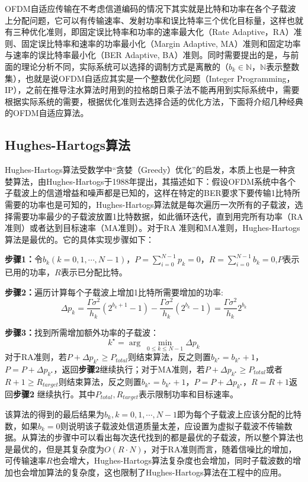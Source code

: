OFDM自适应传输在不考虑信道编码的情况下其实就是比特和功率在各个子载波上分配问题，它可以有传输速率、发射功率和误比特率三个优化目标量，这样也就有三种优化准则，即固定误比特率和功率的速率最大化（Rate Adaptive，RA）准则、固定误比特率和速率的功率最小化（Margin Adaptive, MA）准则和固定功率与速率的误比特率最小化（BER Adaptive, BA）准则。同时需要提出的是，与前面的理论分析不同，实际系统可以选择的调制方式是离散的（$b_k \in \mathbb{N}$，$\mathbb{N}$表示整数集），也就是说OFDM自适应其实是一个整数优化问题（Integer Programming，IP），之前在推导注水算法时用到的拉格朗日乘子法不能再用到实际系统中，需要根据实际系统的需要，根据优化准则去选择合适的优化方法，下面将介绍几种经典的OFDM自适应算法。
\subsection{Hughes-Hartogs算法}
Hughes-Hartogs算法\cite{hughes1989ensemble}受数学中“贪婪（Greedy）优化”的启发，本质上也是一种贪婪算法，由Hughes-Hartogs于1988年提出，其描述如下：假设OFDM系统中各个子载波上的信道增益和噪声都是已知的，这样在特定的BER要求下要传输1比特所需要的功率也是可知的，Hughes-Hartogs算法就是每次遍历一次所有的子载波，选择需要功率最少的子载波放置1比特数据，如此循环迭代，直到用完所有功率（RA准则）或者达到目标速率（MA准则）。对于RA 准则和MA准则，Hughes-Hartogs算法是最优的。它的具体实现步骤如下：
\begin{description}
\item{\bf{步骤1：}}令$b_k(k=0,1,\cdots,N-1)$，$P=\sum_{i=0}^{N-1}p_k=0$，$R=\sum_{i=0}^{N-1}b_k=0$,$P$表示已用的功率，$R$表示已分配比特。
\item{\bf{步骤2：}}遍历计算每个子载波上增加1比特所需要增加的功率:
\begin{equation}
\Delta p_k=\frac{\Gamma\sigma^2}{h_k}(2^{b_k+1}-1)-\frac{\Gamma\sigma^2}{h_k}(2^{b_k}-1)=\frac{\Gamma\sigma^2}{h_k}2^{b_k}
\end{equation}
\item{\bf{步骤3：}}找到所需增加额外功率的子载波：
\begin{equation}
k^{\star} = \arg\ \underset{0\leq k \leq N-1}{\min}\Delta p_k
\end{equation}
对于RA准则，若$P+\Delta p_{k^\star}\geq P_{total}$则结束算法，反之则置$b_{k^\star}=b_{k^\star}+1$，$P=P+\Delta p_{k^\star}$，返回\textbf{步骤2}继续执行；对于MA准则，若$P+\Delta p_{k^\star}\geq P_{total}$或者$R+1\geq R_{target}$则结束算法，反之则置$b_{k^\star}=b_{k^\star}+1$，$P=P+\Delta p_{k^\star}$，$R=R+1$返回\textbf{步骤2} 继续执行。其中$P_{total}, R_{target}$表示限制功率和目标速率。
\end{description}
该算法的得到的最后结果为$b_k, k=0,1,\cdots,N-1$即为每个子载波上应该分配的比特数，如果$b_k=0$则说明该子载波处信道质量太差，应设置为虚拟子载波不传输数据。从算法的步骤中可以看出每次迭代找到的都是最优的子载波，所以整个算法也是最优的，但是其复杂度为$O(R\cdot N)$，对于RA准则而言，随着信噪比的增加，可传输速率$R$也会增大，Hughes-Hartogs算法复杂度也会增加，同时子载波数的增加也会增加算法的复杂度，这也限制了Hughes-Hartogs算法在工程中的应用。
